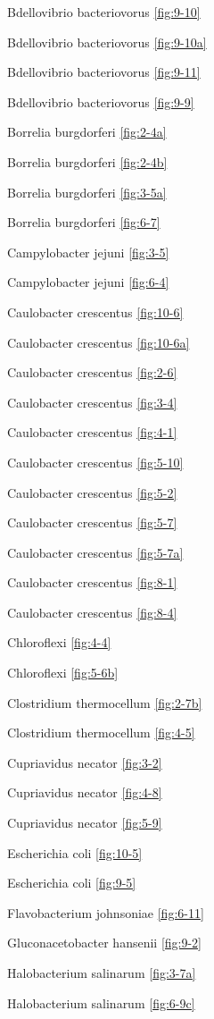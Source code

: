 \documentclass[]{tufte-book}
\begin{document}
Bdellovibrio bacteriovorus \ref{fig:9-10}

Bdellovibrio bacteriovorus \ref{fig:9-10a}

Bdellovibrio bacteriovorus \ref{fig:9-11}

Bdellovibrio bacteriovorus \ref{fig:9-9}

Borrelia burgdorferi \ref{fig:2-4a}

Borrelia burgdorferi \ref{fig:2-4b}

Borrelia burgdorferi \ref{fig:3-5a}

Borrelia burgdorferi \ref{fig:6-7}

Campylobacter jejuni \ref{fig:3-5}

Campylobacter jejuni \ref{fig:6-4}

Caulobacter crescentus \ref{fig:10-6}

Caulobacter crescentus \ref{fig:10-6a}

Caulobacter crescentus \ref{fig:2-6}

Caulobacter crescentus \ref{fig:3-4}

Caulobacter crescentus \ref{fig:4-1}

Caulobacter crescentus \ref{fig:5-10}

Caulobacter crescentus \ref{fig:5-2}

Caulobacter crescentus \ref{fig:5-7}

Caulobacter crescentus \ref{fig:5-7a}

Caulobacter crescentus \ref{fig:8-1}

Caulobacter crescentus \ref{fig:8-4}

Chloroflexi \ref{fig:4-4}

Chloroflexi \ref{fig:5-6b}

Clostridium thermocellum \ref{fig:2-7b}

Clostridium thermocellum \ref{fig:4-5}

Cupriavidus necator \ref{fig:3-2}

Cupriavidus necator \ref{fig:4-8}

Cupriavidus necator \ref{fig:5-9}

Escherichia coli \ref{fig:10-5}

Escherichia coli \ref{fig:9-5}

Flavobacterium johnsoniae \ref{fig:6-11}

Gluconacetobacter hansenii \ref{fig:9-2}

Halobacterium salinarum \ref{fig:3-7a}

Halobacterium salinarum \ref{fig:6-9c}
\end{document}
